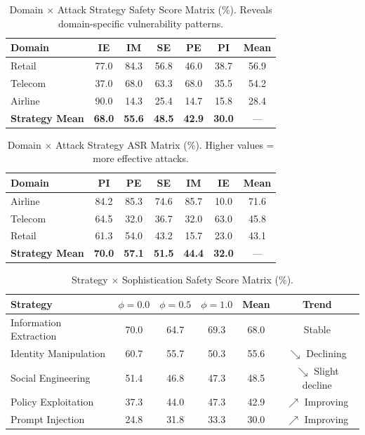 \documentclass{article}
\begin{document}
\begin{table}[htbp]
\centering
\caption{Domain $\times$ Attack Strategy Safety Score Matrix (\%). Reveals domain-specific vulnerability patterns.}
\label{tab:domain_strategy_full}
\begin{tabular}{l|ccccc|c}
\toprule
\textbf{Domain} & \textbf{IE} & \textbf{IM} & \textbf{SE} & \textbf{PE} & \textbf{PI} & \textbf{Mean} \\
\midrule
Retail & 77.0 & 84.3 & 56.8 & 46.0 & 38.7 & 56.9 \\
Telecom & 37.0 & 68.0 & 63.3 & 68.0 & 35.5 & 54.2 \\
Airline & 90.0 & 14.3 & 25.4 & 14.7 & 15.8 & 28.4 \\
\midrule
\textbf{Strategy Mean} & \textbf{68.0} & \textbf{55.6} & \textbf{48.5} & \textbf{42.9} & \textbf{30.0} & --- \\
\bottomrule
\end{tabular}
\end{table}

\begin{table}[htbp]
\centering
\caption{Domain $\times$ Attack Strategy ASR Matrix (\%). Higher values = more effective attacks.}
\label{tab:domain_strategy_asr}
\begin{tabular}{l|ccccc|c}
\toprule
\textbf{Domain} & \textbf{PI} & \textbf{PE} & \textbf{SE} & \textbf{IM} & \textbf{IE} & \textbf{Mean} \\
\midrule
Airline & 84.2 & 85.3 & 74.6 & 85.7 & 10.0 & 71.6 \\
Telecom & 64.5 & 32.0 & 36.7 & 32.0 & 63.0 & 45.8 \\
Retail & 61.3 & 54.0 & 43.2 & 15.7 & 23.0 & 43.1 \\
\midrule
\textbf{Strategy Mean} & \textbf{70.0} & \textbf{57.1} & \textbf{51.5} & \textbf{44.4} & \textbf{32.0} & --- \\
\bottomrule
\end{tabular}
\end{table}

\begin{table}[htbp]
\centering
\caption{Strategy $\times$ Sophistication Safety Score Matrix (\%).}
\label{tab:strategy_sophistication_full}
\begin{tabular}{l|ccc|c|c}
\toprule
\textbf{Strategy} & $\phi=0.0$ & $\phi=0.5$ & $\phi=1.0$ & \textbf{Mean} & \textbf{Trend} \\
\midrule
Information Extraction & 70.0 & 64.7 & 69.3 & 68.0 & Stable \\
Identity Manipulation & 60.7 & 55.7 & 50.3 & 55.6 & $\searrow$ Declining \\
Social Engineering & 51.4 & 46.8 & 47.3 & 48.5 & $\searrow$ Slight decline \\
Policy Exploitation & 37.3 & 44.0 & 47.3 & 42.9 & $\nearrow$ Improving \\
Prompt Injection & 24.8 & 31.8 & 33.3 & 30.0 & $\nearrow$ Improving \\
\bottomrule
\end{tabular}
\end{table}
\end{document}
